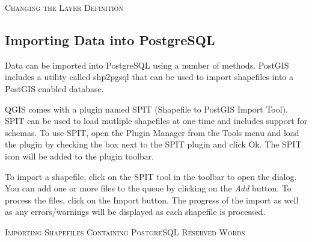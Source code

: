 \begin{Tip}\caption{\textsc{Changing the Layer Definition}}
\end{Tip}

\subsection{Importing Data into PostgreSQL}\label{sec:loading_postgis_data}
Data can be imported into PostgreSQL using a number of methods. PostGIS includes a utility called shp2pgsql that can be used to import shapefiles into a PostGIS enabled database. 

QGIS comes with a
plugin named SPIT (Shapefile to PostGIS Import Tool).
SPIT can be used to load mutliple shapefiles at one time and includes support
for schemas. To use SPIT, open the Plugin Manager from the Tools menu and load
the plugin by checking the box next to the SPIT plugin and click Ok. The SPIT
icon will be added to the plugin toolbar. 

To import a shapefile, click on the SPIT tool in the toolbar to open the dialog.
You can add one or more files to the queue by clicking on the \textsl{Add}
button. To process the files, click on the Import button. The progress of the
import as well as any errors/warnings will be displayed as each shapefile is
processed.  
\begin{Tip}\caption{\textsc{Importing Shapefiles Containing
PostgreSQL Reserved Words}}
\end{Tip} 
